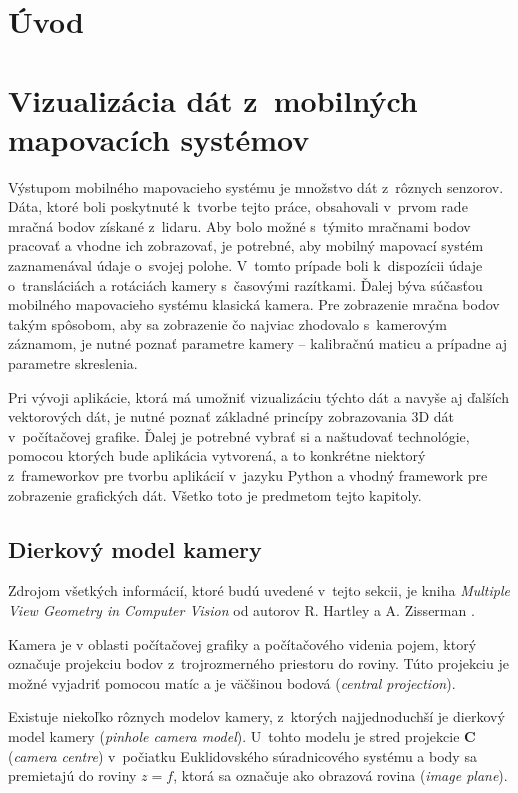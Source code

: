 %

\chapter{Úvod}

\chapter{Vizualizácia dát z~mobilných mapovacích systémov}

Výstupom mobilného mapovacieho systému je množstvo dát z~rôznych senzorov. Dáta, ktoré boli poskytnuté k~tvorbe tejto práce, obsahovali v~prvom rade mračná bodov získané z~lidaru. Aby bolo možné s~týmito mračnami bodov pracovať a vhodne ich zobrazovať, je potrebné, aby mobilný mapovací systém zaznamenával údaje o~svojej polohe. V~tomto prípade boli k~dispozícii údaje o~transláciách a rotáciách kamery s~časovými razítkami. Ďalej býva súčasťou mobilného mapovacieho systému klasická kamera. Pre zobrazenie mračna bodov takým spôsobom, aby sa zobrazenie čo najviac zhodovalo s~kamerovým záznamom, je nutné poznať parametre kamery -- kalibračnú maticu a prípadne aj parametre skreslenia.

Pri vývoji aplikácie, ktorá má umožniť vizualizáciu týchto dát a navyše aj ďalších vektorových dát, je nutné poznať základné princípy zobrazovania 3D dát v~počítačovej grafike. Ďalej je potrebné vybrať si a naštudovať technológie, pomocou ktorých bude aplikácia vytvorená, a to konkrétne niektorý z~frameworkov pre tvorbu aplikácií v~jazyku Python a vhodný framework pre zobrazenie grafických dát. Všetko toto je predmetom tejto kapitoly.

\section{Dierkový model kamery}

Zdrojom všetkých informácií, ktoré budú uvedené v~tejto sekcii, je kniha \emph{Multiple View Geometry in Computer Vision} od autorov R. Hartley a A. Zisserman \cite{multiple_view_geometry}.

Kamera je v oblasti počítačovej grafiky a počítačového videnia pojem, ktorý označuje projekciu bodov z~trojrozmerného priestoru do roviny. Túto projekciu je možné vyjadriť pomocou matíc a je väčšinou bodová (\emph{central projection}).

Existuje niekoľko rôznych modelov kamery, z~ktorých najjednoduchší je dierkový model kamery (\emph{pinhole camera model}). U~tohto modelu je stred projekcie $\mathbf{C}$  (\emph{camera centre}) v~počiatku Euklidovského súradnicového systému a body sa premietajú do roviny $z = f$, ktorá sa označuje ako obrazová rovina (\emph{image plane}).

